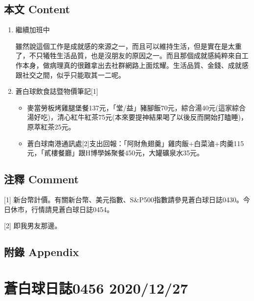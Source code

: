 \documentclass[a5paper, 11pt
]{book}
\providecommand{\tightlist}{%
  \setlength{\itemsep}{0pt}\setlength{\parskip}{0pt}}
\begin{document}
\hypertarget{ux672cux6587-content-25}{%
\subsection{本文 Content}\label{ux672cux6587-content-25}}

\begin{enumerate}
\def\labelenumi{\arabic{enumi}.}
\item
  繼續加班中

  雖然說這個工作是成就感的來源之一，而且可以維持生活，但是實在是太重了，不只犧牲生活品質，也是沒朋友的原因之一。而且那個成就感純粹來自工作本身，做病理真的很難拿出去社群網路上面炫耀。生活品質、金錢、成就感跟社交之間，似乎只能取其一二呢。
\item
  蒼白球飲食誌暨物價筆記{[}1{]}

  \begin{itemize}
  \tightlist
  \item
    麥當勞板烤雞腿堡餐137元，「堂/益」豬腳飯70元，綜合湯40元(這家綜合湯好吃)，清心紅牛紅茶75元(本來要提神結果喝了以後反而開始打瞌睡)，原萃紅茶25元。
  \item
    蒼白球南港通訊處{[}2{]}支出回報：「阿財魚翅羹」雞肉飯+白菜滷+肉羹115元，「貳樓餐廳」跟H博學姊聚餐450元，大罐礦泉水35元。
  \end{itemize}
\end{enumerate}

\hypertarget{ux6ce8ux91cb-comment-25}{%
\subsection{注釋 Comment}\label{ux6ce8ux91cb-comment-25}}

{[}1{]}
新台幣計價。有關新台幣、美元指數、S\&P500指數請參見蒼白球日誌0430。今日休市，行情請見蒼白球日誌0454。

{[}2{]} 即我男友那邊。

\hypertarget{ux9644ux9304-appendix-25}{%
\subsection{附錄 Appendix}\label{ux9644ux9304-appendix-25}}

\hypertarget{ux84bcux767dux7403ux65e5ux8a8c0456-20201227}{%
\section{蒼白球日誌0456
2020/12/27}\label{ux84bcux767dux7403ux65e5ux8a8c0456-20201227}}
\end{document}
